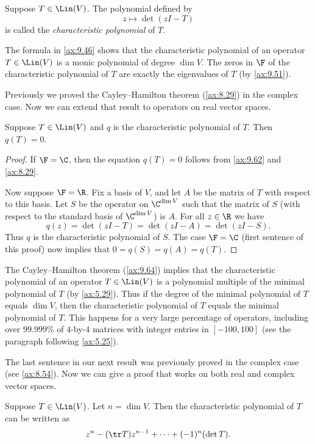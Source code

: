 \begin{definition}\label{ax:9.63}
Suppose $T\in\Lin(V)$. The polynomial defined by
\[ z\mapsto\det(zI-T) \]
is called the \emph{characteristic polynomial} of $T$.
\end{definition}

The formula in \ref{ax:9.46} shows that the characteristic polynomial of an
operator $T\in\Lin(V)$ is a monic polynomial of degree $\dim V$. The zeros in
$\F$ of the characteristic polynomial of $T$ are exactly the eigenvalues of $T$
(by \ref{ax:9.51}).

Previously we proved the Cayley--Hamilton theorem (\ref{ax:8.29}) in the
complex case. Now we can extend that result to operators on real vector spaces.

\begin{result}\label{ax:9.64}
Suppose $T\in\Lin(V)$ and $q$ is the characteristic polynomial of $T$. Then
$q(T)=0$.
\end{result}

\begin{proof}
If $\F=\C$, then the equation $q(T)=0$ follows from \ref{ax:9.62} and
\ref{ax:8.29}.

Now suppose $\F=\R$. Fix a basis of $V$, and let $A$ be the matrix of $T$ with
respect to this basis. Let $S$ be the operator on $\C^{\dim V}$ such that the
matrix of $S$ (with respect to the standard basis of $\C^{\dim V}$) is $A$. For
all $z\in\R$ we have
\[ q(z) = \det(zI-T) = \det(zI-A) = \det(zI-S). \]
Thus $q$ is the characteristic polynomial of $S$. The case $\F=\C$ (first
sentence of this proof) now implies that $0=q(S)=q(A)=q(T)$.
\end{proof}

The Cayley--Hamilton theorem (\ref{ax:9.64}) implies that the characteristic
polynomial of an operator $T\in\Lin(V)$ is a polynomial multiple of the minimal
polynomial of $T$ (by \ref{ax:5.29}). Thus if the degree of the minimal
polynomial of $T$ equals $\dim V$, then the characteristic polynomial of $T$
equals the minimal polynomial of $T$. This happens for a very large percentage
of operators, including over $99.999\%$ of $4$-by-$4$ matrices with integer
entries in $[-100,100]$ (see the paragraph following \ref{ax:5.25}).

The last sentence in our next result was previously proved in the complex case
(see \ref{ax:8.54}). Now we can give a proof that works on both real and
complex vector spaces.

\begin{result}\label{ax:9.65}
Suppose $T\in\Lin(V)$. Let $n=\dim V$. Then the characteristic polynomial of
$T$ can be written as
\[ z^n - (\tr T)z^{n-1} + \cdots + (-1)^n(\det T). \]
\end{result}

